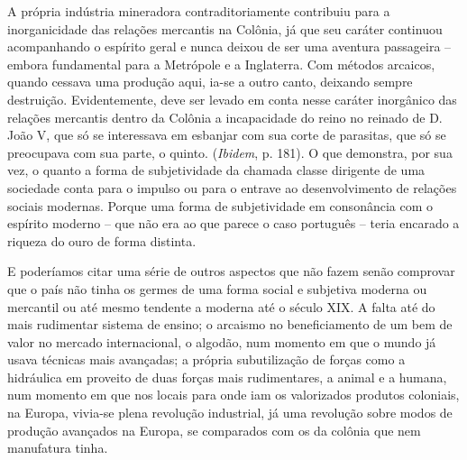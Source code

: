 A própria indústria mineradora contraditoriamente contribuiu para a
inorganicidade das relações mercantis na Colônia, já que seu caráter
continuou acompanhando o espírito geral e nunca deixou de ser uma
aventura passageira -- embora fundamental para a Metrópole e a
Inglaterra. Com métodos arcaicos, quando cessava uma produção aqui,
ia-se a outro canto, deixando sempre destruição. Evidentemente, deve ser
levado em conta nesse caráter inorgânico das relações mercantis dentro
da Colônia a incapacidade do reino no reinado de D. João V, que só se
interessava em esbanjar com sua corte de parasitas, que só se preocupava
com sua parte, o quinto. (\emph{Ibidem}, p. 181). O que demonstra, por
sua vez, o quanto a forma de subjetividade da chamada classe dirigente
de uma sociedade conta para o impulso ou para o entrave ao
desenvolvimento de relações sociais modernas. Porque uma forma de
subjetividade em consonância com o espírito moderno -- que não era ao
que parece o caso português -- teria encarado a riqueza do ouro de forma
distinta.

E poderíamos citar uma série de outros aspectos que não fazem senão
comprovar que o país não tinha os germes de uma forma social e subjetiva
moderna ou mercantil ou até mesmo tendente a moderna até o século XIX. A
falta até do mais rudimentar sistema de ensino; o arcaismo no
beneficiamento de um bem de valor no mercado internacional, o algodão,
num momento em que o mundo já usava técnicas mais avançadas; a própria
subutilização de forças como a hidráulica em proveito de duas forças
mais rudimentares, a animal e a humana, num momento em que nos locais
para onde iam os valorizados produtos coloniais, na Europa, vivia-se
plena revolução industrial, já uma revolução sobre modos de produção
avançados na Europa, se comparados com os da colônia que nem manufatura
tinha.


